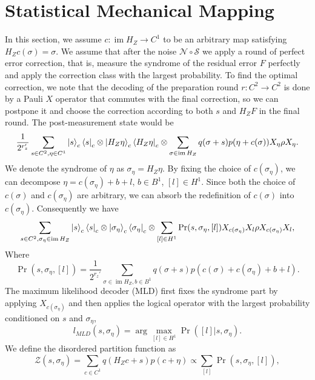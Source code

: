 \documentclass[twoside,english,aps,showpacs,pra,superscriptaddress]{revtex4-2}
\DeclareMathOperator{\im}{im}
\begin{document}
\section{Statistical Mechanical Mapping}
In this section, we assume $c: \im H_Z \rightarrow C^1$ to be an arbitrary map satisfying $H_Zc(\sigma)=\sigma$. We assume that after the noise $\mathcal{N} \circ \mathcal{S}$ we apply a round of perfect error correction, that is, measure the syndrome of the residual error $F$ perfectly and apply the correction class with the largest probability. To find the optimal correction, we note that the decoding of the preparation round $r:C^2 \rightarrow C^2$ is done by a Pauli $X$ operator that commutes with the final correction, so we can postpone it and choose the correction according to both $s$ and $H_Z F$ in the final round. The post-measurement state would be
\begin{equation}
    \frac{1}{2^{r_z'}}\sum_{s\in C^2, \eta \in C^1}  \ket{s}_c\bra{s}_c \otimes \ket{H_Z \eta}_c\bra{H_Z \eta}_c \otimes  \sum_{\sigma \in \im H_Z}  q(\sigma+s) p(\eta + c(\sigma)) X_\eta \rho X_\eta.
\end{equation}
We denote the syndrome of $\eta$ as $\sigma_\eta = H_Z \eta$. By fixing the choice of  $c(\sigma_\eta)$, we can decompose $\eta = c(\sigma_\eta)+b+l$, $b \in B^1$, $[l] \in H^1$. Since both the choice of $c(\sigma)$ and $c(\sigma_\eta)$ are arbitrary, we can absorb the redefinition of $c(\sigma)$ into $c(\sigma_\eta)$. Consequently we have
\begin{equation}
    \sum_{s\in C^2, \sigma_\eta \in \im H_Z}  \ket{s}_c\bra{s}_c \otimes \ket{\sigma_\eta }_c\bra{\sigma_\eta }_c \otimes \sum_{[l]\in H^1} \Pr(s,\sigma_\eta,[l]) X_{c(\sigma_\eta)} X_l\rho X_{c(\sigma_\eta)} X_l,
\end{equation}
Where 
\begin{equation}
    \Pr(s,\sigma_\eta,[l]) = \frac{1}{2^{r_z'}}\sum_{\sigma\in \im H_Z, b\in B^1} q(\sigma+s)p(c(\sigma)+c(\sigma_\eta)+b+l).
\end{equation}
The maximum likelihood decoder (MLD) first fixes the syndrome part by applying $X_{c(\sigma_\eta)}$ and then applies the logical operator with the largest probability conditioned on $s$ and $\sigma_\eta$,
\begin{equation}
    l_{MLD}(s,\sigma_\eta) = \arg \max_{[l] \in H^1} \Pr([l]|s,\sigma_\eta).
\end{equation}
We define the disordered partition function as 
\begin{equation}
    \mathcal Z(s,\sigma_\eta)  =  \sum_{c\in C^1} q(H_Z c +s)p(c+\eta)  \propto \sum_{[l]} \Pr(s,\sigma_\eta,[l]),
\end{equation}
\end{document}
